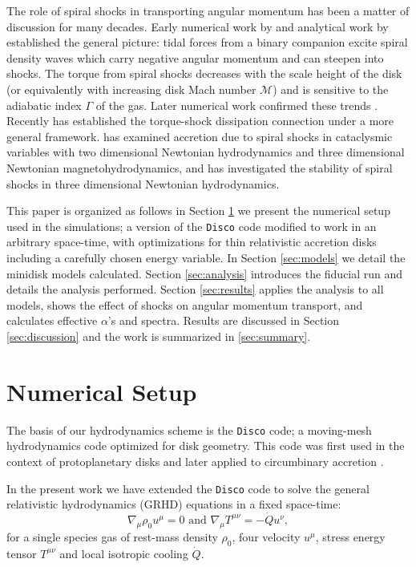 \documentclass{emulateapj}
\newcommand{\Disco}{{\texttt{Disco}}}
\begin{document}
The role of spiral shocks in transporting angular momentum has been a matter of discussion for many decades.  Early numerical work by \cite{Sawada86} and analytical work by \cite{Spruit87} established the general picture: tidal forces from a binary companion excite spiral density waves which carry negative angular momentum and can steepen into shocks.  The torque from spiral shocks decreases with the scale height of the disk (or equivalently with increasing disk Mach number $\mathcal{M}$) and is sensitive to the adiabatic index $\Gamma$ of the gas.  Later numerical work confirmed these trends \citep{Godon98, Blondin00}.  Recently \cite{Rafikov16} has established the torque-shock dissipation connection under a more general framework.  \cite{Ju16} has examined accretion due to spiral shocks in cataclysmic variables with two dimensional Newtonian hydrodynamics and three dimensional Newtonian magnetohydrodynamics,  and \cite{Bae16} has investigated the stability of spiral shocks in three dimensional Newtonian hydrodynamics.


This paper is organized as follows in Section \ref{sec:numerics} we present the
numerical setup used in the simulations; a version of the \Disco{} code 
modified to work in an arbitrary space-time, with optimizations for thin 
relativistic accretion disks including a carefully chosen energy variable.  In Section \ref{sec:models} we detail the 
minidisk models calculated.  Section \ref{sec:analysis} introduces the fiducial run and details the analysis performed.  Section \ref{sec:results} applies the analysis to all models, shows the effect of shocks on angular momentum transport, and calculates effective $\alpha$'s and spectra. Results are discussed in Section \ref{sec:discussion} and the work is summarized in \ref{sec:summary}.



\section{Numerical Setup}
\label{sec:numerics}


The basis of our hydrodynamics scheme is the \Disco{} code; a moving-mesh hydrodynamics
code optimized for disk geometry. This code was first used in the context of
protoplanetary disks \citep{Duffell12, Duffell13, Duffell14} and later applied 
to circumbinary accretion \citep{Farris14, Farris15A, Farris15B}. 

In the present work we have extended the \Disco{} code to solve the general relativistic hydrodynamics (GRHD) equations in a fixed space-time:
\begin{equation}
    \nabla_\mu \rho_0 u^\mu = 0 \text{ and } \nabla_\mu T^{\mu\nu} = -\dot{Q} u^\nu , \label{eq:GRHD}
\end{equation}
for a single species gas of rest-mass density $\rho_0$, four velocity $u^\mu$, 
stress energy tensor $T^{\mu\nu}$ and local isotropic cooling $\dot{Q}$.  
\end{document}
